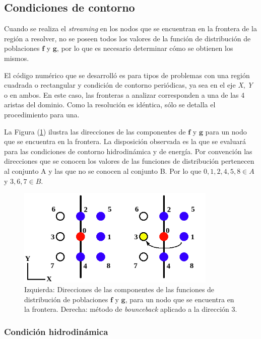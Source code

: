 \subsection{Condiciones de contorno}

Cuando se realiza el \textit{streaming} en los nodos que se encuentran en la frontera de la región a resolver, no se poseen todos los valores de la función de distribución de poblaciones $\mathbf{f}$ y $\mathbf{g}$, por lo que es necesario determinar cómo se obtienen los mismos. 

El código numérico que se desarrolló es para tipos de problemas con una región cuadrada o rectangular y condición de contorno periódicas, ya sea en el eje \textit{X}, \textit{Y} o en ambos. En este caso, las fronteras a analizar corresponden a una de las 4 aristas del dominio. Como la resolución es idéntica, sólo se detalla el procedimiento para una.

La Figura (\ref{fig:CC_hidro}) ilustra las direcciones de las componentes de $\mathbf{f}$ y $\mathbf{g}$ para un nodo que se encuentra en la frontera. La disposición observada es la que se evaluará para las condiciones de contorno hidrodinámica y de energía.  Por convención las direcciones que se conocen los valores de las funciones de distribución pertenecen al conjunto A y las que no se conocen al conjunto B. Por lo que $ 0, 1, 2, 4, 5, 8 \in A$ y $ 3, 6, 7 \in B$. 

\begin{figure}[h!]
	\centering
	\includegraphics[width=0.85\textwidth]{figs/cap2/CC_hidrodinamica.png}
	\caption{Izquierda: Direcciones de las componentes de las funciones de distribución de poblaciones $\mathbf{f}$ y $\mathbf{g}$, para un nodo que se encuentra en la frontera. Derecha: método de \textit{bounceback} aplicado a la dirección 3.}
	\label{fig:CC_hidro}
\end{figure}




\subsubsection{Condición hidrodinámica}

